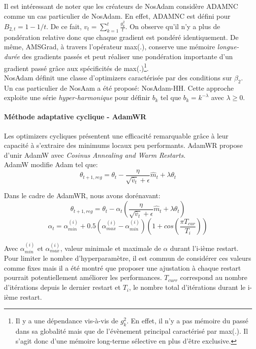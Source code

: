 \noindent Il est intéressant de noter que les créateurs de NosAdam considère ADAMNC comme un cas particulier de NosAdam. En effet, ADAMNC est défini pour $B_{2,t}=1-1/t$. De ce fait, $v_t=\sum_{k=1}^t \frac{g_k^2}{t}$. On observe qu'il n'y a plus de pondération relative donc que chaque gradient est pondéré identiquement. De même, AMSGrad, à travers l'opérateur max(.), conserve une mémoire \textit{longue-durée} des gradients passés et peut réaliser une pondération importante d'un gradient passé grâce aux spécificités de max(.)\footnote{Il y a une dépendance vis-à-vis de $g_k^2$. En effet, il n'y a pas mémoire du passé dans sa globalité mais que de l'évènement principal caractérisé par max(.). Il s'agit donc d'une mémoire long-terme sélective en plus d'être exclusive.}.\\

\noindent NosAdam définit une classe d'optimizers caractérisée par des conditions sur $\beta_2$. Un cas particulier de NosAam a été proposé: NosAdam-HH. Cette approche exploite une série \textit{hyper-harmonique} pour définir $b_k$ tel que $b_k=k^{-\lambda}$ avec $\lambda \geq 0$.

\paragraph{Méthode adaptative cyclique - AdamWR}

Les optimizers cycliques présentent une efficacité remarquable grâce à leur capacité à s'extraire des minimums locaux peu performants. AdamWR\cite{adamw} propose d'unir AdamW avec \textit{Cosinus Annealing and Warm Restarts}.\\

\noindent AdamW modifie Adam tel que:
$$\theta_{t+1,reg} = \theta_{t} - \dfrac{\eta}{\sqrt{\hat{v}_t} + \epsilon} \hat{m}_t + \lambda \theta_{t}$$

\noindent Dans le cadre de AdamWR, nous avons dorénavant:
$$\theta_{t+1,reg} = \theta_{t} - \alpha_t(\dfrac{\eta}{\sqrt{\hat{v}_t} + \epsilon} \hat{m}_t + \lambda \theta_{t})$$
$$\alpha_t=\alpha_{min}^{(i)}+0.5(\alpha_{max}^{(i)}-\alpha_{min}^{(i)})(1+cos(\frac{\pi T_{cur}}{T_i})) $$

\noindent Avec $\alpha_{min}^{(i)}$ et $\alpha_{max}^{(i)}$, valeur minimale et maximale de $\alpha$ durant l'i-ième restart. Pour limiter le nombre d'hyperparamètre, il est commun de considérer ces valeurs comme fixes mais il a été montré que proposer une ajustation à chaque restart pourrait potentiellement améliorer les performances. $T_{curr}$ correspond au nombre d'itérations depuis le dernier restart et $T_i$, le nombre total d'itérations durant le i-ième restart.\\

